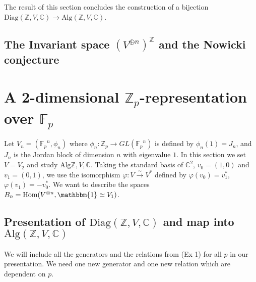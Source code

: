 \documentclass[11pt]{article} %
\begin{document}
\begin{tikzpicture}[scale = 0.75]








\end{tikzpicture}

The result of this section concludes the construction of a bijection $\text{Diag}({\mathbb{Z},V,\mathbb{C}}) \rightarrow \text{Alg}({\mathbb{Z},V,\mathbb{C}})$.

\subsection{The Invariant space $(V^{\oplus n})^{\mathbb{Z}}$ and the Nowicki conjecture}
\section{A 2-dimensional $\mathbb{Z}_p$-representation over $\mathbb{F}_p$}

Let $V_n=({\mathbb{F}_p}^n,\phi_n)$ where $\phi_n: \mathbb{Z}_p \rightarrow GL({\mathbb{F}_p}^n)$ is defined by $\phi_n(1)=J_n$, and $J_n$ is the Jordan block of dimension $n$ with eigenvalue $1$. In this section we set $V=V_2$ and study $\text{Alg}{\mathbb{Z},V, \mathbb{C}}$. Taking the standard basis of $\mathbb{C}^2$, $v_0 = (1,0)$ and  $v_1 = (0,1)$, we use the isomorphism $\varphi:V \xrightarrow{\sim} V^{\ast}$ defined by $\varphi(v_0)=v_1^{\ast}$, $\varphi(v_1)=-v_0^{\ast}$. We want to describe the spaces $B_n = \text{Hom}(V^{\otimes n},\mathbbm{1} \simeq V_1)$.

\subsection {Presentation of $\text{Diag}{(\mathbb{Z},V,\mathbb{C})}$ and map into $\text{Alg}{(\mathbb{Z},V,\mathbb{C})}$}

We will include all the generators and the relations from (Ex 1) for all $p$ in our presentation. We need one new generator and one new relation which are dependent on $p$.
\end{document}
